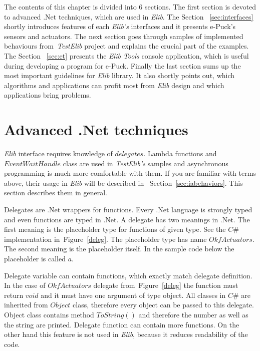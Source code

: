  The contents of this chapter is divided into 6 sections.
  The first section is devoted to advanced .Net techniques, which are used in {\it Elib}.
  The Section ~\ref{sec:interfaces} shortly introduces features of each {\it Elib's} interfaces and 
  it presents e-Puck's sensors and actuators.
  The next section goes through samples of implemented behaviours 
  from~{\it TestElib} project and explains the crucial part of the examples.
  The Section ~\ref{sec:et} presents the {\it Elib Tools} console application, 
  which is useful during developing a program for e-Puck.
  Finally the last section sums up the most important guidelines for {\it Elib} library.
  It also shortly points out, which algorithms and applications can profit most
  from {\it Elib} design and which applications bring problems.
  
\section{Advanced .Net techniques} \label{sec:net}
  {\it Elib} interface requires knowledge of $delegates$. Lambda functions and $EventWaitHandle$ class
  are used in {\it TestElib's} samples and asynchronous programming is much more comfortable with them.
  If you are familiar with terms above, their usage in {\it Elib} will be described in~ Section~\ref{sec:iabehaviors}.
  This section describes them in general.

  Delegates are .Net wrappers for functions. Every .Net language is strongly typed and even functions are typed in .Net.
  A delegate has two meanings in .Net. The first meaning is the placeholder type for functions of given type. 
  See the $C\#$ implementation in~Figure~\ref{deleg}. The placeholder type has name $OkfActuators$.
  The second meaning is the placeholder itself. In the sample code below the placeholder is called $a$.

  Delegate variable can contain functions, which exactly match delegate definition. In the case of $OkfActuators$ 
  delegate from~Figure~\ref{deleg} the function must return
  $void$ and it must have one argument of type object. All classes in $C\#$ are inherited from $Object$ class, 
  therefore every object can be passed to this delegate. 
  Object class contains method $ToString()$ and therefore the number as well as the string are printed.  
  Delegate function can contain more functions. On the other hand this feature is not used in {\it Elib}, 
  because it reduces readability of the code.
  

